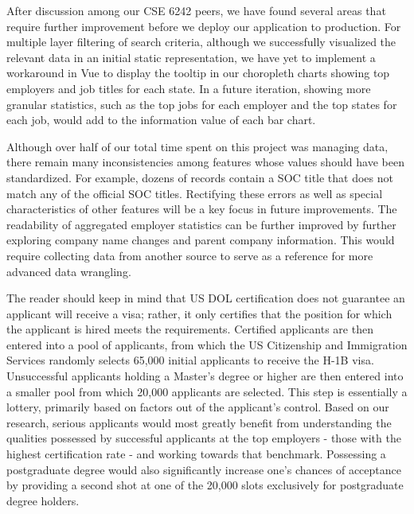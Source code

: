 \documentclass[sigconf]{acmart}
\begin{document}
After discussion among our CSE 6242 peers, we have found several areas that require further 
improvement before we deploy our application to production. 
For multiple layer filtering of search criteria, although we successfully visualized the 
relevant data in an initial static representation, we have yet to implement a workaround 
in Vue to display the tooltip in our choropleth charts showing top employers 
and job titles for each state. In a future iteration, showing more granular statistics, 
such as the top jobs for each employer and the top states for each job, would add to 
the information value of each bar chart. 

Although over half of our total time spent on this project 
was managing data, there remain many inconsistencies among features whose values 
should have been standardized. For example, dozens of records contain a SOC title 
that does not match any of the official SOC titles. Rectifying these errors as well 
as special characteristics of other features will be a key focus in future improvements. 
The readability of aggregated employer statistics can be further improved by further exploring 
company name changes and parent company information. This would require collecting data from another 
source to serve as a reference for more advanced data wrangling. 

The reader should keep in mind that US DOL certification does not guarantee an 
applicant will receive a visa; 
rather, it only certifies that the 
position for which the applicant is hired meets the requirements. 
Certified applicants are then entered into a pool of 
applicants, from which the US Citizenship and Immigration Services randomly 
selects 65,000 initial applicants to receive 
the H-1B visa. Unsuccessful applicants holding a Master's degree or higher are 
then entered into a smaller pool from which 
20,000 applicants are selected. This step is essentially a lottery, 
primarily based on factors out of 
the applicant's control. Based on our research, serious applicants would most 
greatly benefit from understanding the 
qualities possessed by successful applicants at the top employers - those with 
the highest certification rate - and 
working towards that benchmark. Possessing a postgraduate degree would also 
significantly increase one's chances of 
acceptance by providing a second shot at one of the 20,000 slots exclusively 
for postgraduate degree holders. 
\end{document}
